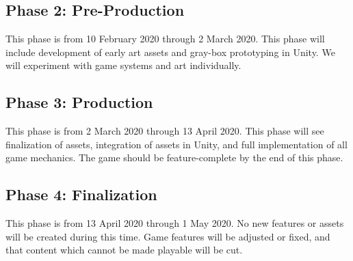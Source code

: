 \documentclass[titlepage]{article}
\begin{document}
\subsection*{Phase 2: Pre-Production}

This phase is from 10 February 2020 through 2 March 2020. This phase will
include development of early art assets and gray-box prototyping in Unity.
We will experiment with game systems and art individually.

\subsection*{Phase 3: Production}

This phase is from 2 March 2020 through 13 April 2020. This phase will see
finalization of assets, integration of assets in Unity, and full implementation
of all game mechanics. The game should be feature-complete by the end of this
phase.

\subsection*{Phase 4: Finalization}

This phase is from 13 April 2020 through 1 May 2020. No new features or assets
will be created during this time. Game features will be adjusted or fixed, and
that content which cannot be made playable will be cut.

\end{document}
